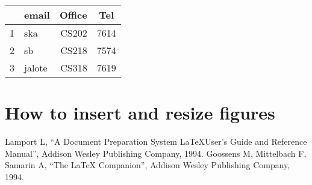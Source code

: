 \documentclass{article}
\begin{document}
\begin{center}
\begin{tabular}{|r|l|r|c|}\hline
  & email & Office & Tel \\\hline
1 & ska & CS202 & 7614\\\hline
2 & sb & CS218 & 7574\\\hline
3 & jalote & CS318 & 7619\\\hline
\end{tabular}
\end{center}

\section{How to insert and resize figures}

\begin{center}
\end{center}


\begin{thebibliography}{99}
 Lamport L, ``A Document Preparation System \LaTeX  User's
Guide and Reference Manual'', Addison Wesley Publishing Company, 1994.
 Goossens M, Mittelbach F, Samarin A, ``The \LaTeX
Companion'', Addison Wesley Publishing Company, 1994.
\end{thebibliography}
\end{document}
